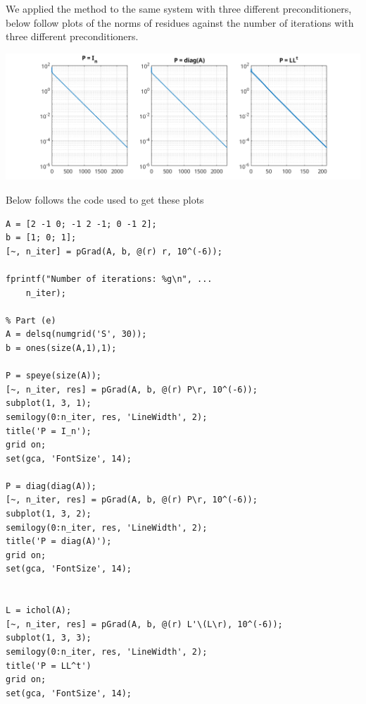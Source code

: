 \documentclass{article}
\begin{document}
We applied the method to the same system with three different 
preconditioners, below follow plots of the norms of residues against
the number of iterations with three different preconditioners.

\begin{center}
	\includegraphics[width=\textwidth]{figure.png}
\end{center}

Below follows the code used to get these plots

\begin{Verbatim}[frame=single,
	label=\textsc{Matlab} code - main.m]
% Part (d)
A = [2 -1 0; -1 2 -1; 0 -1 2];
b = [1; 0; 1];
[~, n_iter] = pGrad(A, b, @(r) r, 10^(-6));

fprintf("Number of iterations: %g\n", ...
    n_iter);

% Part (e)
A = delsq(numgrid('S', 30));
b = ones(size(A,1),1);

P = speye(size(A));
[~, n_iter, res] = pGrad(A, b, @(r) P\r, 10^(-6));
subplot(1, 3, 1);
semilogy(0:n_iter, res, 'LineWidth', 2);
title('P = I_n');
grid on;
set(gca, 'FontSize', 14);

P = diag(diag(A));
[~, n_iter, res] = pGrad(A, b, @(r) P\r, 10^(-6));
subplot(1, 3, 2);
semilogy(0:n_iter, res, 'LineWidth', 2);
title('P = diag(A)');
grid on;
set(gca, 'FontSize', 14);


L = ichol(A);
[~, n_iter, res] = pGrad(A, b, @(r) L'\(L\r), 10^(-6));
subplot(1, 3, 3);
semilogy(0:n_iter, res, 'LineWidth', 2);
title('P = LL^t')
grid on;
set(gca, 'FontSize', 14);

\end{Verbatim}
\end{document}
